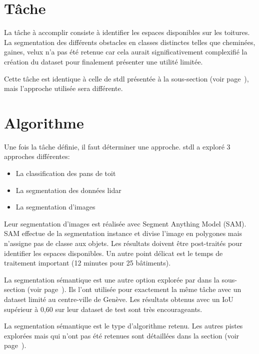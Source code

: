 \section{Tâche}
La tâche à accomplir consiste à identifier les espaces disponibles sur les toitures. La segmentation des différents obstacles en classes distinctes telles que cheminées, gaines, velux n'a pas été retenue car cela aurait significativement complexifié la création du dataset pour finalement présenter une utilité limitée.

Cette tâche est identique à celle de \acrshort{stdl} présentée à la sous-section \textit{} (voir page~\pageref{subsec:stdl_analyse}), mais l'approche utilisée sera différente.

\section{Algorithme}
Une fois la tâche définie, il faut déterminer une approche. \acrshort{stdl} a exploré 3 approches différentes:
\begin{itemize}
    \item La classification des pans de toit
    \item La segmentation des données \gls{lidar}
    \item La segmentation d'images
\end{itemize}

Leur segmentation d'images est réalisée avec Segment Anything Model (SAM). SAM effectue de la segmentation instance et divise l'image en polygones mais n'assigne pas de classe aux objets. Les résultats doivent être post-traités pour identifier les espaces disponibles. Un autre point délicat est le temps de traitement important (12 minutes pour 25 bâtiments).

La segmentation sémantique est une autre option explorée par \citeauthor{castello_quantification_2021} dans la sous-section \textit{} (voir page~\pageref{subsec:castello_quantification_2021}). Ils l'ont utilisée pour exactement la même tâche avec un dataset limité au centre-ville de Genève. Les résultats obtenus avec un IoU supérieur à 0,60 sur leur dataset de test sont très encourageants.

La segmentation sémantique est le type d'algorithme retenu. Les autres pistes explorées mais qui n'ont pas été retenues sont détaillées dans la section \textit{} (voir page~\pageref{sec:pistes_explorees}).

